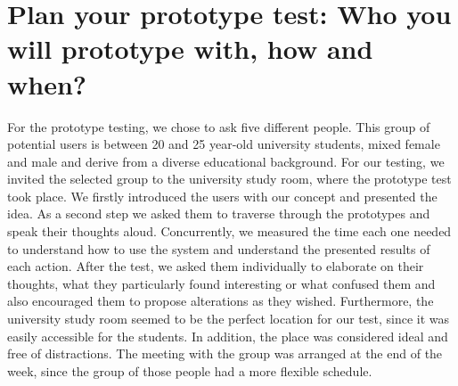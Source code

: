 \section{Plan your prototype test: Who you will prototype with, how and when?}
\label{s_6}

For the prototype testing, we chose to ask five different people. This group of 
potential users is between 20 and 25 year-old university students, mixed female 
and male and derive from a diverse educational background. 
For our testing, we invited the selected group to the university study room, 
where the prototype test took place. We firstly introduced the users with our 
concept and presented the idea. As a second step we asked them to traverse 
through the prototypes and speak their thoughts aloud. Concurrently, we measured 
the time each one needed to understand how to use the system and understand the 
presented results of each action. After the test, we asked them individually to 
elaborate on their thoughts, what they particularly found interesting or what 
confused them and also encouraged them to propose alterations as they wished. 
Furthermore, the university study room seemed to be the perfect location for our 
test, since it was easily accessible for the students. In addition, the place 
was considered ideal and free of distractions. 
The meeting with the group was arranged at the end of the week, since the group 
of those people had a more flexible schedule.

